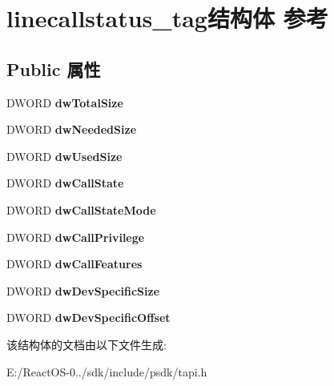 \hypertarget{structlinecallstatus__tag}{}\section{linecallstatus\+\_\+tag结构体 参考}
\label{structlinecallstatus__tag}
\subsection*{Public 属性}
\begin{DoxyCompactItemize}
\item 
\mbox{\label{structlinecallstatus__tag_a955be2f502acd66b8daa941effc61ce8}} 
D\+W\+O\+RD {\bfseries dw\+Total\+Size}
\item 
\mbox{\label{structlinecallstatus__tag_a1cbc4ceb3dfae474b98d73ee148ffcd0}} 
D\+W\+O\+RD {\bfseries dw\+Needed\+Size}
\item 
\mbox{\label{structlinecallstatus__tag_a143574201ca5ffb29c66585e48f594fa}} 
D\+W\+O\+RD {\bfseries dw\+Used\+Size}
\item 
\mbox{\label{structlinecallstatus__tag_add1b6bc8419e8a410bc1ba59d0a5edd0}} 
D\+W\+O\+RD {\bfseries dw\+Call\+State}
\item 
\mbox{\label{structlinecallstatus__tag_ae1c2676de2b11654d1a73d615f31b0f4}} 
D\+W\+O\+RD {\bfseries dw\+Call\+State\+Mode}
\item 
\mbox{\label{structlinecallstatus__tag_a446e54a8c24fe0fc858e1a767bcfe843}} 
D\+W\+O\+RD {\bfseries dw\+Call\+Privilege}
\item 
\mbox{\label{structlinecallstatus__tag_a9841dcc7301e90ab1ae8379c72170600}} 
D\+W\+O\+RD {\bfseries dw\+Call\+Features}
\item 
\mbox{\label{structlinecallstatus__tag_afd9317b7b141af51fb7fedc90fbb3b43}} 
D\+W\+O\+RD {\bfseries dw\+Dev\+Specific\+Size}
\item 
\mbox{\label{structlinecallstatus__tag_a355c4e78ebf3b612550ef3ba2541d44c}} 
D\+W\+O\+RD {\bfseries dw\+Dev\+Specific\+Offset}
\end{DoxyCompactItemize}


该结构体的文档由以下文件生成\+:\begin{DoxyCompactItemize}
\item 
E\+:/\+React\+O\+S-\/0../sdk/include/psdk/tapi.\+h\end{DoxyCompactItemize}
